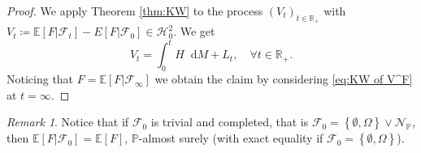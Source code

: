 \documentclass[11pt,a4paper,twoside,openany]{report}
\numberwithin{equation}{section}
\newcommand{\diff}{\mathop{}\!\mathrm{d}}
\theoremstyle{plain} %
\theoremstyle{definition} %
\theoremstyle{remark} %
\newtheorem{remark}[theorem]{Remark}
\begin{document}
\begin{proof}
    We apply Theorem \ref{thm:KW} to the process \((V_t)_{t\in\mathbb{R}_+}\) with \(V_t\coloneqq \mathbb
    E[F|\mathcal{F}_t]- E[F|\mathcal{F}_0]\in\mathcal{H}_0^2\). We get 
    \begin{equation}\label{eq:KW of V^F}
        V_t=\int_0^t H\diff M+L_t,\quad\forall t\in\mathbb{R}_+.
    \end{equation}
    Noticing that \(F=\mathbb{E}[F|\mathcal{F}_{\infty}]\) we obtain the claim by considering \eqref{eq:KW of V^F} at \(t=\infty\). 
\end{proof}
\begin{remark}
Notice that if \(\mathcal{F}_0\) is trivial and completed, that is \(\mathcal{F}_0=\left\{\emptyset,\Omega\right\}\vee\mathcal{N}_{\mathbb{P}}\), then \(\mathbb{E}[F|\mathcal{F}_0]=\mathbb{E}[F]\), \(\mathbb{P}\)-almost surely (with exact equality if \(\mathcal{F}_0=\left\{\emptyset,\Omega\right\}\)). 
\end{remark}
\end{document}
